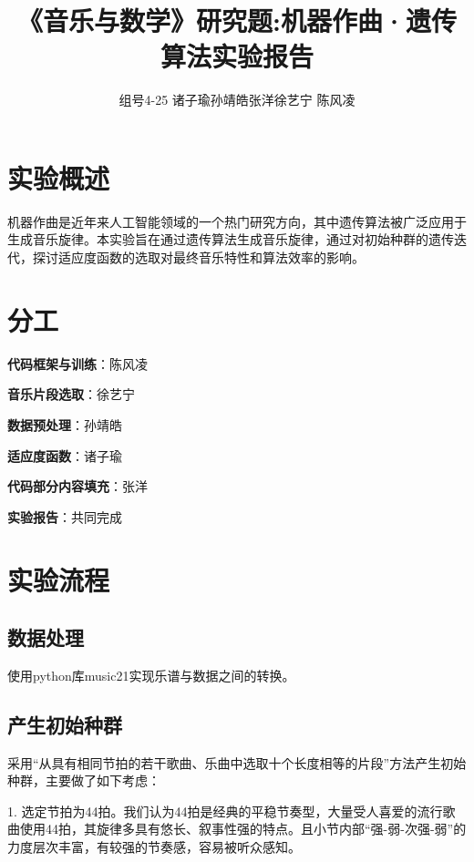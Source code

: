 \documentclass{article}
\begin{document}
\title{ \textbf{《音乐与数学》研究题:机器作曲·遗传算法\quad 实验报告}}
\author{组号4-25 \quad 
诸子瑜\quad 孙靖皓\quad 张洋\quad 徐艺宁 \quad 陈风凌}

\maketitle

\begin{center}
\tableofcontents
\end{center}

\newpage


\section{实验概述}

机器作曲是近年来人工智能领域的一个热门研究方向，其中遗传算法被广泛应用于生成音乐旋律。本实验旨在通过遗传算法生成音乐旋律，通过对初始种群的遗传迭代，探讨适应度函数的选取对最终音乐特性和算法效率的影响。

\section{分工}

\textbf{代码框架与训练}：陈风凌

\textbf{音乐片段选取}：徐艺宁

\textbf{数据预处理}：孙靖皓

\textbf{适应度函数}：诸子瑜

\textbf{代码部分内容填充}：张洋

\textbf{实验报告}：共同完成
\section{实验流程}
\subsection{数据处理}
使用python库music21实现乐谱与数据之间的转换。

\subsection{产生初始种群}
采用“从具有相同节拍的若干歌曲、乐曲中选取十个长度相等的片段”方法产生初始种群，主要做了如下考虑：

1. 选定节拍为44拍。我们认为44拍是经典的平稳节奏型，大量受人喜爱的流行歌曲使用44拍，其旋律多具有悠长、叙事性强的特点。且小节内部“强-弱-次强-弱”的力度层次丰富，有较强的节奏感，容易被听众感知。
\end{document}
